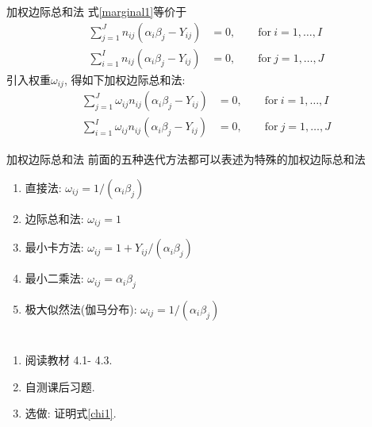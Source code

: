 \documentclass[professionalfont]{beamer}
\begin{document}
\begin{frame}{加权边际总和法}
	式\eqref{marginal1}等价于
\begin{equation}\label{marginal0}
\begin{aligned}
\sum_{j=1}^Jn_{ij}(\alpha_i\beta_j-Y_{ij})&=0,\qquad \text{for} ~ i=1,\ldots,I\\
\sum_{i=1}^In_{ij}(\alpha_i\beta_j-Y_{ij})&=0,\qquad \text{for} ~ j=1,\ldots,J
\end{aligned}
\end{equation}
引入权重$\omega_{ij}$, 得如下加权边际总和法:
\begin{equation}\label{marginal0}
\begin{aligned}
\sum_{j=1}^J\omega_{ij}n_{ij}(\alpha_i\beta_j-Y_{ij})&=0,\qquad \text{for} ~ i=1,\ldots,I\\
\sum_{i=1}^I\omega_{ij}n_{ij}(\alpha_i\beta_j-Y_{ij})&=0,\qquad \text{for} ~ j=1,\ldots,J
\end{aligned}
\end{equation}
\end{frame}

\begin{frame}{加权边际总和法}
	前面的五种迭代方法都可以表述为特殊的加权边际总和法
	\begin{enumerate}
		\item 直接法: $\omega_{ij}=1/(\alpha_i\beta_j)$
		\item 边际总和法: $\omega_{ij}=1$
		\item 最小卡方法: $\omega_{ij}=1+Y_{ij}/(\alpha_i\beta_j)$
		\item 最小二乘法: $\omega_{ij}=\alpha_i\beta_j$
		\item 极大似然法(伽马分布): $\omega_{ij}=1/(\alpha_i\beta_j)$
\end{enumerate}
\end{frame}
\section*{}
\begin{frame}
\begin{enumerate}
		\item 阅读教材 4.1- 4.3.
		\item 自测课后习题. 
		\item 选做: 证明式\eqref{chi1}.
\end{enumerate}
\end{frame}
\end{document}
